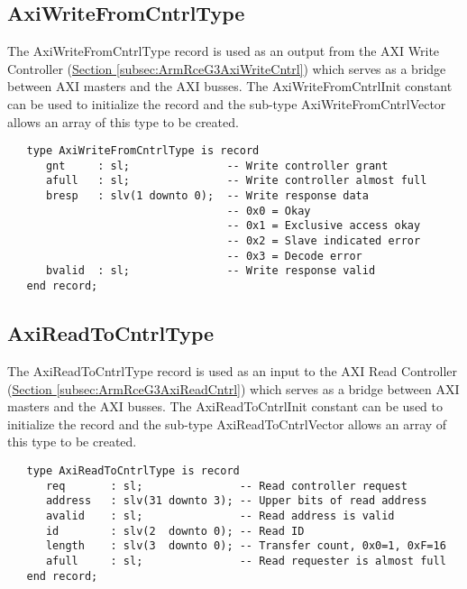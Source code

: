 \documentclass[11pt]{article}
\begin{document}
\subsection{AxiWriteFromCntrlType}
\label{subsec:AxiWriteFromCntrlType}

The AxiWriteFromCntrlType record is used as an output from the AXI Write Controller (\hyperref[subsec:ArmRceG3AxiWriteCntrl]{Section \ref*{subsec:ArmRceG3AxiWriteCntrl}}) which serves as a bridge between AXI masters and the AXI busses.
The AxiWriteFromCntrlInit constant can be used to initialize the record and the sub-type AxiWriteFromCntrlVector allows an array of this type to be created.

\small
\begin{verbatim}
   type AxiWriteFromCntrlType is record
      gnt     : sl;               -- Write controller grant
      afull   : sl;               -- Write controller almost full
      bresp   : slv(1 downto 0);  -- Write response data
                                  -- 0x0 = Okay
                                  -- 0x1 = Exclusive access okay
                                  -- 0x2 = Slave indicated error 
                                  -- 0x3 = Decode error
      bvalid  : sl;               -- Write response valid
   end record;
\end{verbatim}
\normalsize

\subsection{AxiReadToCntrlType}
\label{subsec:AxiReadToCntrlType}

The AxiReadToCntrlType record is used as an input to the AXI Read Controller (\hyperref[subsec:ArmRceG3AxiReadCntrl]{Section \ref*{subsec:ArmRceG3AxiReadCntrl}}) which serves as a bridge between AXI masters and the AXI busses.
The AxiReadToCntrlInit constant can be used to initialize the record and the sub-type AxiReadToCntrlVector allows an array of this type to be created.

\small
\begin{verbatim}
   type AxiReadToCntrlType is record
      req       : sl;               -- Read controller request
      address   : slv(31 downto 3); -- Upper bits of read address
      avalid    : sl;               -- Read address is valid
      id        : slv(2  downto 0); -- Read ID
      length    : slv(3  downto 0); -- Transfer count, 0x0=1, 0xF=16
      afull     : sl;               -- Read requester is almost full
   end record;
\end{verbatim}
\normalsize
\end{document}
